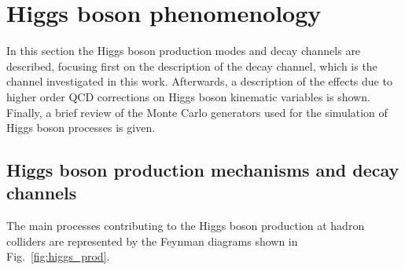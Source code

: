 \section{Higgs boson phenomenology}
\label{sec:HiggsPheno}

In this section the Higgs boson production modes and decay channels are described, focusing first on the description of the \hww decay channel, which is the channel investigated in this work. Afterwards, a description of the effects due to higher order QCD corrections on Higgs boson kinematic variables is shown. Finally, a brief review of the Monte Carlo generators used for the simulation of Higgs boson processes is given.





\subsection{Higgs boson production mechanisms and decay channels}

The main processes contributing to the Higgs boson production at hadron colliders are represented by the Feynman diagrams shown in Fig.~\ref{fig:higgs_prod}.

